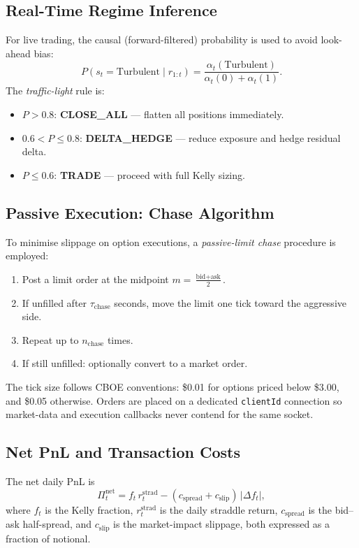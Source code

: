 \documentclass[conference]{IEEEtran}
\newcommand{\abs}[1]{\lvert #1 \rvert}
\begin{document}
\subsection{Real-Time Regime Inference}

For live trading, the causal (forward-filtered) probability is used to
avoid look-ahead bias:
\begin{equation}\label{eq:filtering}
  P(s_t = \text{Turbulent}\mid r_{1:t}) =
  \frac{\alpha_t(\text{Turbulent})}{\alpha_t(0) + \alpha_t(1)}.
\end{equation}
The \emph{traffic-light} rule is:
\begin{itemize}
  \item $P > 0.8$: \textbf{CLOSE\_ALL} — flatten all positions immediately.
  \item $0.6 < P \leq 0.8$: \textbf{DELTA\_HEDGE} — reduce exposure
        and hedge residual delta.
  \item $P \leq 0.6$: \textbf{TRADE} — proceed with full Kelly sizing.
\end{itemize}

\subsection{Passive Execution: Chase Algorithm}

To minimise slippage on option executions, a \emph{passive-limit chase}
procedure is employed:
\begin{enumerate}
  \item Post a limit order at the midpoint
        $m = \frac{\text{bid} + \text{ask}}{2}$.
  \item If unfilled after $\tau_{\text{chase}}$ seconds, move the
        limit one tick toward the aggressive side.
  \item Repeat up to $n_{\text{chase}}$ times.
  \item If still unfilled: optionally convert to a market order.
\end{enumerate}
The tick size follows CBOE conventions: \$0.01 for options priced
below \$3.00, and \$0.05 otherwise.  Orders are placed on a dedicated
\texttt{clientId} connection so market-data and execution callbacks
never contend for the same socket.

\subsection{Net PnL and Transaction Costs}

The net daily PnL is
\begin{equation}\label{eq:net_pnl}
  \Pi_t^{\text{net}} = f_t\, r_t^{\text{strad}}
    - (c_{\text{spread}} + c_{\text{slip}})\,\abs{\Delta f_t},
\end{equation}
where $f_t$ is the Kelly fraction, $r_t^{\text{strad}}$ is the
daily straddle return, $c_{\text{spread}}$ is the bid--ask
half-spread, and $c_{\text{slip}}$ is the market-impact slippage,
both expressed as a fraction of notional.
\end{document}
